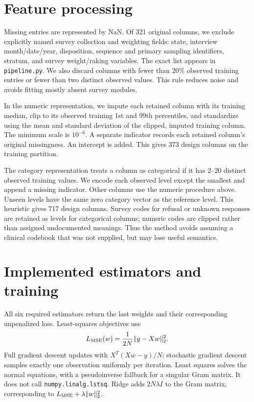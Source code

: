 \documentclass[10pt,conference,compsocconf]{IEEEtran}
\begin{document}
\section{Feature processing}
Missing entries are represented by NaN. Of 321 original columns, we exclude explicitly named survey collection and weighting fields: state, interview month/date/year, disposition, sequence and primary sampling identifiers, stratum, and survey weight/raking variables. The exact list appears in \texttt{pipeline.py}. We also discard columns with fewer than 20\% observed training entries or fewer than two distinct observed values. This rule reduces noise and avoids fitting mostly absent survey modules.

In the numeric representation, we impute each retained column with its training median, clip to its observed training 1st and 99th percentiles, and standardize using the mean and standard deviation of the clipped, imputed training column. The minimum scale is $10^{-6}$. A separate indicator records each retained column's original missingness. An intercept is added. This gives 373 design columns on the training partition.

The category representation treats a column as categorical if it has 2--20 distinct observed training values. We encode each observed level except the smallest and append a missing indicator. Other columns use the numeric procedure above. Unseen levels have the same zero category vector as the reference level. This heuristic gives 717 design columns. Survey codes for refusal or unknown responses are retained as levels for categorical columns; numeric codes are clipped rather than assigned undocumented meanings. Thus the method avoids assuming a clinical codebook that was not supplied, but may lose useful semantics.

\section{Implemented estimators and training}
All six required estimators return the last weights and their corresponding unpenalized loss. Least-squares objectives use
\[
L_{\rm MSE}(w)=\frac{1}{2N}\|y-Xw\|_2^2.
\]
Full gradient descent updates with $X^T(Xw-y)/N$; stochastic gradient descent samples exactly one observation uniformly per iteration. Least squares solves the normal equations, with a pseudoinverse fallback for a singular Gram matrix. It does not call \texttt{numpy.linalg.lstsq}. Ridge adds $2N\lambda I$ to the Gram matrix, corresponding to $L_{\rm MSE}+\lambda\|w\|_2^2$.
\end{document}
